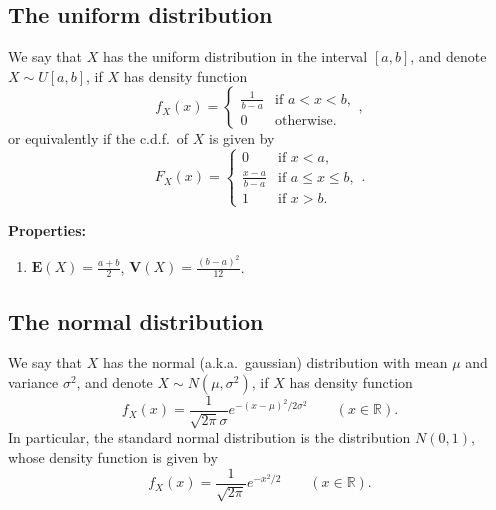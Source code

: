 \documentclass[12pt]{article}
\newcommand{\R}{\mathbb{R}}
\newcommand{\expec}{\mathbf{E}}
\newcommand{\var}{\mathbf{V}}
\theoremstyle{example}
\begin{document}
\subsection{The uniform distribution}

We say that $X$ has the uniform distribution in the interval $[a,b]$, and denote $X\sim U[a,b]$, if $X$ has density function
$$ f_X(x) = \begin{cases} \frac{1}{b-a} & \textrm{if }a<x<b, \\ 0 & \textrm{otherwise}. \end{cases},
$$
or equivalently if the c.d.f.\ of $X$ is given by
$$
F_X(x) = \begin{cases} 0 & \textrm{if }x<a, \\
\frac{x-a}{b-a} & \textrm{if }a\le x\le b, \\
1 & \textrm{if }x>b. \end{cases}.
$$

\noindent \textbf{Properties:}
\begin{enumerate}
\item $\expec(X) = \frac{a+b}{2}$, $\var(X) = \frac{(b-a)^2}{12}$.
\end{enumerate}


\subsection{The normal distribution}

\label{sec:normal-dist}

We say that $X$ has the normal (a.k.a.\ gaussian) distribution with mean $\mu$ and variance $\sigma^2$, and denote $X\sim N(\mu,\sigma^2)$, if $X$ has density function
$$
f_X(x) = \frac{1}{\sqrt{2\pi} \sigma} e^{-(x-\mu)^2/2\sigma^2} \qquad (x\in\R).
$$
In particular, the standard normal distribution is the distribution $N(0,1)$, whose density function is given by
$$
f_X(x) = \frac{1}{\sqrt{2\pi}} e^{-x^2/2} \qquad (x\in\R).
$$
\end{document}

